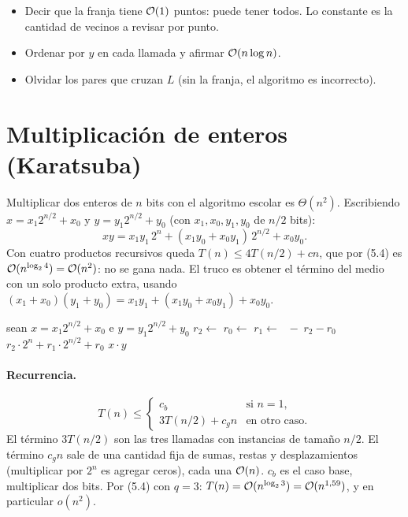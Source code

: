 \begin{trampa}
\begin{itemize}
  \item Decir que la franja tiene $\mathcal{O}(1)$ puntos: puede tener todos. Lo constante es la cantidad de vecinos a revisar por punto.
  \item Ordenar por $y$ en cada llamada y afirmar $\mathcal{O}(n\log n)$.
  \item Olvidar los pares que cruzan $L$ (sin la franja, el algoritmo es incorrecto).
\end{itemize}
\end{trampa}

\section{Multiplicación de enteros (Karatsuba)}\label{sec:dyc-karatsuba}

Multiplicar dos enteros de $n$ bits con el algoritmo escolar es $\Theta(n^2)$. Escribiendo $x=x_1 2^{n/2}+x_0$ y $y=y_1 2^{n/2}+y_0$ (con $x_1,x_0,y_1,y_0$ de $n/2$ bits):
\[
xy=x_1y_1\,2^n+(x_1y_0+x_0y_1)\,2^{n/2}+x_0y_0 .
\]
Con cuatro productos recursivos queda $T(n)\le 4T(n/2)+cn$, que por (5.4) es $\mathcal{O}(n^{\log_2 4})=\mathcal{O}(n^2)$: no se gana nada. El truco es obtener el término del medio con un solo producto extra, usando $(x_1+x_0)(y_1+y_0)=x_1y_1+(x_1y_0+x_0y_1)+x_0y_0$.

\begin{algorithmic}[1]
    \State sean $x=x_1 2^{n/2}+x_0$ e $y=y_1 2^{n/2}+y_0$
    \State $r_2\gets$ 
    \State $r_0\gets$ 
    \State $r_1\gets$ $\;-\;r_2-r_0$
    \State \Return $r_2\cdot 2^n+r_1\cdot 2^{n/2}+r_0$
  \Else
    \State \Return $x\cdot y$ 
  \EndIf
\EndFunction
\end{algorithmic}

\paragraph{Recurrencia.}
\[
T(n)\le\begin{cases} c_b & \text{si } n=1,\\ 3T(n/2)+c_g n & \text{en otro caso.}\end{cases}
\]
El término $3T(n/2)$ son las tres llamadas con instancias de tamaño $n/2$. El término $c_gn$ sale de una cantidad fija de sumas, restas y desplazamientos (multiplicar por $2^n$ es agregar ceros), cada una $\mathcal{O}(n)$. $c_b$ es el caso base, multiplicar dos bits. Por (5.4) con $q=3$: $T(n)=\mathcal{O}(n^{\log_2 3})=\mathcal{O}(n^{1{,}59})$, y en particular $o(n^2)$.

